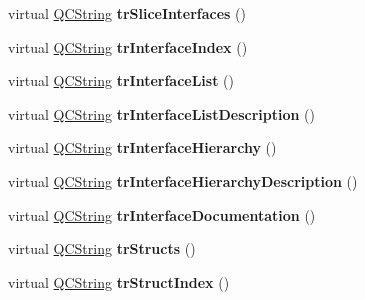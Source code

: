 \begin{DoxyCompactItemize}
\item 
\mbox{\label{class_translator_french_af310eb02c6305ac2ff6c243d13eaa942}} 
virtual \mbox{\hyperlink{class_q_c_string}{Q\+C\+String}} {\bfseries tr\+Slice\+Interfaces} ()
\item 
\mbox{\label{class_translator_french_a8b894a8b1bf6d115cc7c38133710cb8c}} 
virtual \mbox{\hyperlink{class_q_c_string}{Q\+C\+String}} {\bfseries tr\+Interface\+Index} ()
\item 
\mbox{\label{class_translator_french_a5b798a6f49e96259fca283ace8ccf216}} 
virtual \mbox{\hyperlink{class_q_c_string}{Q\+C\+String}} {\bfseries tr\+Interface\+List} ()
\item 
\mbox{\label{class_translator_french_aa08768750de178cff8b5b92ab0d03127}} 
virtual \mbox{\hyperlink{class_q_c_string}{Q\+C\+String}} {\bfseries tr\+Interface\+List\+Description} ()
\item 
\mbox{\label{class_translator_french_a4ac8ebff00c2f24386451095d7124610}} 
virtual \mbox{\hyperlink{class_q_c_string}{Q\+C\+String}} {\bfseries tr\+Interface\+Hierarchy} ()
\item 
\mbox{\label{class_translator_french_a9a8c374d58bc952e6ade2dbc62812f5d}} 
virtual \mbox{\hyperlink{class_q_c_string}{Q\+C\+String}} {\bfseries tr\+Interface\+Hierarchy\+Description} ()
\item 
\mbox{\label{class_translator_french_adc9da29567759c2566db503399fbe5a8}} 
virtual \mbox{\hyperlink{class_q_c_string}{Q\+C\+String}} {\bfseries tr\+Interface\+Documentation} ()
\item 
\mbox{\label{class_translator_french_a3c925ef088d234ac4e7f1110e20b2c55}} 
virtual \mbox{\hyperlink{class_q_c_string}{Q\+C\+String}} {\bfseries tr\+Structs} ()
\item 
\mbox{\label{class_translator_french_ab4a089c3529365f07628f3ed803510d3}} 
virtual \mbox{\hyperlink{class_q_c_string}{Q\+C\+String}} {\bfseries tr\+Struct\+Index} ()

\end{DoxyCompactItemize}
